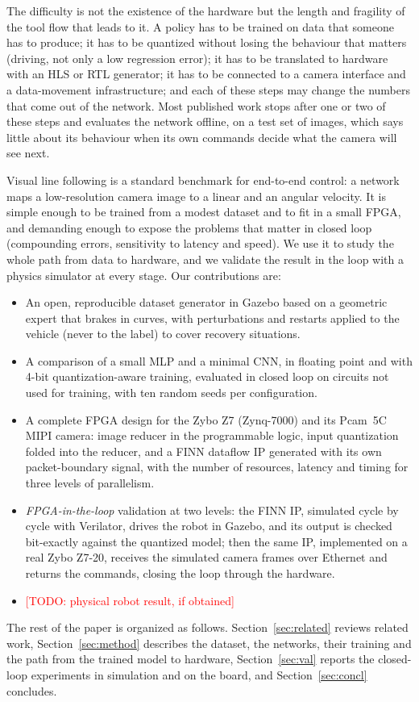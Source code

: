 \documentclass{article}
\newcommand{\TODO}[1]{\textcolor{red}{[TODO: #1]}}
\begin{document}
The difficulty is not the existence of the hardware but the length and fragility of the tool flow that leads to it. A policy has to be trained on data
that someone has to produce; it has to be quantized without losing the behaviour that matters (driving, not only a low regression error); it has to be
translated to hardware with an HLS or RTL generator; it has to be connected to a camera interface and a data-movement infrastructure; and each of these steps
may change the numbers that come out of the network. Most published work stops after one or two of these steps and evaluates the network offline, on a
test set of images, which says little about its behaviour when its own commands decide what the camera will see next.

Visual line following is a standard benchmark for end-to-end control: a network maps a low-resolution camera image to a linear and an
angular velocity. It is simple enough to be trained from a modest dataset and to fit in a small FPGA, and demanding enough to expose the problems that
matter in closed loop (compounding errors, sensitivity to latency and speed). We use it to study the whole path from data to hardware, and we validate the
result in the loop with a physics simulator at every stage. Our contributions are:
\begin{itemize}
  \item An open, reproducible dataset generator in Gazebo based on a geometric expert that brakes in curves, with perturbations
        and restarts applied to the vehicle (never to the label) to cover recovery situations.
  \item A comparison of a small MLP and a minimal CNN, in floating point and with 4-bit quantization-aware training,
        evaluated in closed loop on circuits not used for training, with ten random seeds per configuration.
  \item A complete FPGA design for the Zybo Z7 (Zynq-7000) and its Pcam~5C MIPI camera: image reducer in the programmable logic, input
        quantization folded into the reducer, and a FINN dataflow IP generated with its own packet-boundary signal, with the number of resources,
        latency and timing for three levels of parallelism.
  \item \emph{FPGA-in-the-loop} validation at two levels: the FINN IP, simulated cycle by cycle with Verilator, drives the robot in Gazebo, and its
        output is checked bit-exactly against the quantized model; then the same IP, implemented on a real Zybo Z7-20, receives the simulated camera frames
        over Ethernet and returns the commands, closing the loop through the hardware.
  \item \TODO{physical robot result, if obtained}
\end{itemize}
The rest of the paper is organized as follows. Section~\ref{sec:related} reviews related work, Section~\ref{sec:method} describes the dataset, the
networks, their training and the path from the trained model to hardware, Section~\ref{sec:val} reports the closed-loop experiments in simulation and
on the board, and Section~\ref{sec:concl} concludes.
\end{document}
